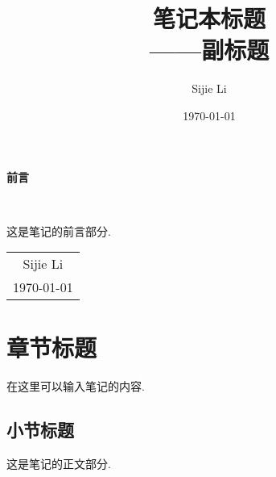 \documentclass[12pt, a4paper, oneside]{ctexbook} %
\title{{\Huge{\textbf{笔记本标题}}}\\——副标题}
\author{Sijie Li}
\date{\today}
\begin{document}
\maketitle

\setcounter{page}{1}

\begin{center}
    \Huge\textbf{前言}
\end{center}~\

这是笔记的前言部分. 

\begin{flushright}
    \begin{tabular}{c}
        Sijie Li\\
        \today
    \end{tabular}
\end{flushright} %

\newpage
{}
\setcounter{page}{1}
\tableofcontents

\newpage
\setcounter{page}{1}

\chapter{章节标题}

在这里可以输入笔记的内容.

\section{小节标题}

这是笔记的正文部分.
\end{document}
